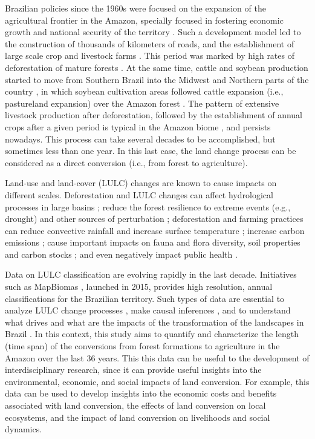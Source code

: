 \documentclass[essd, manuscript]{copernicus}
\begin{document}


\introduction[Introduction]

Brazilian policies since the 1960s were focused on the expansion of the agricultural frontier in the Amazon, specially focused in fostering economic growth and national security of the territory \citep{Carvalho2002, Mcdonald2003, Banerjee2009}.
Such a development model led to the construction of thousands of kilometers of roads, and the establishment of large scale crop and livestock farms \citep{Carvalho2002, Banerjee2009}.
This period was marked by high rates of deforestation of mature forests \citep{Fearnside2005}.
At the same time, cattle and soybean production started to move from Southern Brazil into the Midwest and Northern parts of the country \citep{Silva2020a}, in which soybean cultivation areas followed cattle expansion (i.e., pastureland expansion) over the Amazon forest \citep{Simon2005, Barona2010, Arima2011}.
The pattern of extensive livestock production after deforestation, followed by the establishment of annual crops after a given period is typical in the Amazon biome \citep{Barona2010}, and persists nowadays.
This process can take several decades to be accomplished, but sometimes less than one year.
In this last case, the land change process can be considered as a direct conversion \citep{Morton2006} (i.e., from forest to agriculture).

Land-use and land-cover (LULC) changes are known to cause impacts on different scales.
Deforestation and LULC changes can affect hydrological processes in large basins \citep{Arias2018}; reduce the forest resilience to extreme events (e.g., drought) and other sources of perturbation \citep{Boulton2022}; deforestation and farming practices can reduce convective rainfall and increase surface temperature \citep{Maeda2021}; increase carbon emissions \citep{Gatti2021}; cause important impacts on fauna and flora diversity, soil properties and carbon stocks \citep{Nunes2022, Rittl2017}; and even negatively impact public health \citep{Ellwanger2020}.

Data on LULC classification are evolving rapidly in the last decade.
Initiatives such as MapBiomas \citep{Souza2020}, launched in 2015, provides high resolution, annual classifications for the Brazilian territory.
Such types of data are essential to analyze LULC change processes \citep{Silva2020b}, make causal inferences \citep{Capmourteres2018, Gelo2022, Odongo2014, Larned2020}, and to understand what drives and what are the impacts of the transformation of the landscapes in Brazil \citep{Nunes2022}.
In this context, this study aims to quantify and characterize the length (time span) of the conversions from forest formations to agriculture in the Amazon over the last 36 years.
This this data can be useful to the development of interdisciplinary research, since it can provide useful insights into the environmental, economic, and social impacts of land conversion.
For example, this data can be used to develop insights into the economic costs and benefits associated with land conversion, the effects of land conversion on local ecosystems, and the impact of land conversion on livelihoods and social dynamics.
\end{document}
